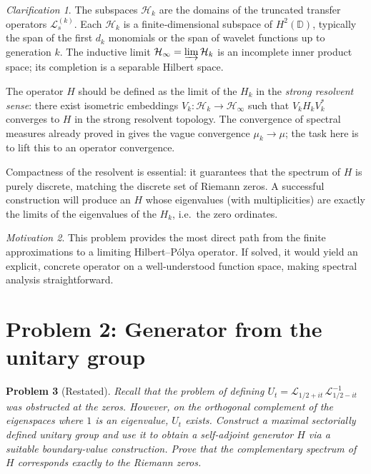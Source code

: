 \documentclass[11pt,a4paper]{article}
\newtheorem{problem}{Problem}[section]
\theoremstyle{remark}
\newtheorem{clarification}[problem]{Clarification}
\newtheorem{motivation}[problem]{Motivation}
\newcommand{\cL}{\mathcal{L}}
\newcommand{\cH}{\mathcal{H}}
\begin{document}
\begin{clarification}
The subspaces $\cH_k$ are the domains of the truncated transfer operators $\cL_s^{(k)}$. Each $\cH_k$ is a finite‑dimensional subspace of $H^2(\mathbb{D})$, typically the span of the first $d_k$ monomials or the span of wavelet functions up to generation $k$. The inductive limit $\cH_\infty = \varinjlim \cH_k$ is an incomplete inner product space; its completion is a separable Hilbert space. 

The operator $H$ should be defined as the limit of the $H_k$ in the \emph{strong resolvent sense}: there exist isometric embeddings $V_k:\cH_k\to\cH_\infty$ such that $V_k H_k V_k^*$ converges to $H$ in the strong resolvent topology. The convergence of spectral measures already proved in \cite{findings} gives the vague convergence $\mu_k\to\mu$; the task here is to lift this to an operator convergence.

Compactness of the resolvent is essential: it guarantees that the spectrum of $H$ is purely discrete, matching the discrete set of Riemann zeros. A successful construction will produce an $H$ whose eigenvalues (with multiplicities) are exactly the limits of the eigenvalues of the $H_k$, i.e.\ the zero ordinates.
\end{clarification}

\begin{motivation}
This problem provides the most direct path from the finite approximations to a limiting Hilbert--Pólya operator. If solved, it would yield an explicit, concrete operator on a well‑understood function space, making spectral analysis straightforward.
\end{motivation}

\section{Problem 2: Generator from the unitary group}

\begin{problem}[Restated]
Recall that the problem of defining $U_t = \cL_{1/2+it}\,\cL_{1/2-it}^{-1}$ was obstructed at the zeros. However, on the orthogonal complement of the eigenspaces where $1$ is an eigenvalue, $U_t$ exists. Construct a maximal sectorially defined unitary group and use it to obtain a self‑adjoint generator $H$ via a suitable boundary‑value construction. Prove that the complementary spectrum of $H$ corresponds exactly to the Riemann zeros.
\end{problem}
\end{document}

